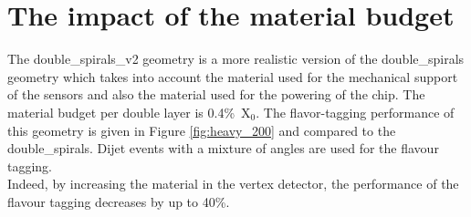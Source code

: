 \section{The impact of the material budget}\label{sec:impactOfMaterialBudget}

The double\_spirals\_v2 geometry is a more realistic version of the double\_spirals geometry which takes into account the material used for the mechanical support of the sensors and also the material used for the powering of the chip. The material budget per double layer is 0.4\%~X$_{0}$.
The flavor-tagging performance of this geometry is given in Figure \ref{fig:heavy_200} and compared to the double\_spirals. Dijet events with a mixture of angles are used for the flavour tagging.\\
Indeed, by increasing the material in the vertex detector, the performance of the flavour tagging decreases by up to 40\%.


